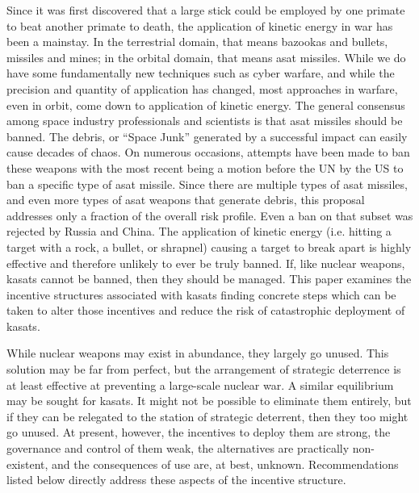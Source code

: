 
\maketitle

\pagestyle{execSummary}
\thispagestyle{firstPage}



Since it was first discovered that a large stick could be employed by
one primate to beat another primate to death, the application of
kinetic energy in war has been a mainstay.  In the terrestrial domain,
that means bazookas and bullets, missiles and mines; in the orbital
domain, that means \ac{asat} missiles.  While we do have some
fundamentally new techniques such as cyber warfare\cite{big-risks},
and while the precision and quantity of application has changed, most
approaches in warfare, even in orbit, come down to application of
kinetic energy.\cite{brian} The general consensus among space industry
professionals and scientists is that \ac{asat} missiles should be
banned.\cite{uocs-no-likey}\cite{carnegie-no-likey} The debris, or
``Space Junk'' generated by a successful impact can easily cause
decades of chaos.\cite{osa-debris} On numerous occasions, attempts
have been made to ban these weapons\cite{early-to-call} with the most
recent being a motion before the UN by the US to ban a specific type
of \ac{asat} missile.\cite{un-asat-me-not} Since there are multiple
types of \ac{asat} missiles, and even more types of \ac{asat} weapons
that generate debris, this proposal addresses only a fraction of the
overall risk profile.\cite{brian} Even a ban on that subset was
rejected by Russia and China.\cite{not-so-chinese} The application of
kinetic energy (i.e. hitting a target with a rock, a bullet, or
shrapnel) causing a target to break apart is highly effective and
therefore unlikely to ever be truly banned.  If, like nuclear weapons,
\acp{kasat} cannot be banned, then they should be managed.  This paper
examines the incentive structures associated with \acp{kasat} finding
concrete steps which can be taken to alter those incentives and reduce
the risk of catastrophic deployment of \acp{kasat}.

While nuclear weapons may exist in abundance, they largely go unused.
This solution may be far from perfect, but the arrangement of
strategic deterrence is at least effective at preventing a large-scale
nuclear war.  A similar equilibrium may be sought for \acp{kasat}.  It
might not be possible to eliminate them entirely, but if they can be
relegated to the station of strategic deterrent, then they too might
go unused.  At present, however, the incentives to deploy them are
strong, the governance and control of them weak, the alternatives are
practically non-existent, and the consequences of use are, at best,
unknown.  Recommendations listed below directly address these aspects
of the incentive structure.

